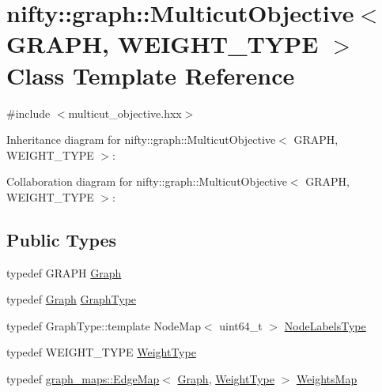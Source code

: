 \hypertarget{classnifty_1_1graph_1_1MulticutObjective}{}\section{nifty\+:\+:graph\+:\+:Multicut\+Objective$<$ G\+R\+A\+P\+H, W\+E\+I\+G\+H\+T\+\_\+\+T\+Y\+P\+E $>$ Class Template Reference}
\label{classnifty_1_1graph_1_1MulticutObjective}


{\ttfamily \#include $<$multicut\+\_\+objective.\+hxx$>$}



Inheritance diagram for nifty\+:\+:graph\+:\+:Multicut\+Objective$<$ G\+R\+A\+P\+H, W\+E\+I\+G\+H\+T\+\_\+\+T\+Y\+P\+E $>$\+:


Collaboration diagram for nifty\+:\+:graph\+:\+:Multicut\+Objective$<$ G\+R\+A\+P\+H, W\+E\+I\+G\+H\+T\+\_\+\+T\+Y\+P\+E $>$\+:
\subsection*{Public Types}
\begin{DoxyCompactItemize}
\item 
typedef G\+R\+A\+P\+H \hyperlink{classnifty_1_1graph_1_1MulticutObjective_a041c561c434976179cbe5a3aebd4dac3}{Graph}
\item 
typedef \hyperlink{classnifty_1_1graph_1_1MulticutObjective_a041c561c434976179cbe5a3aebd4dac3}{Graph} \hyperlink{classnifty_1_1graph_1_1MulticutObjective_a8f0a93eb6756753344c8cce17a7ccafe}{Graph\+Type}
\item 
typedef Graph\+Type\+::template Node\+Map$<$ uint64\+\_\+t $>$ \hyperlink{classnifty_1_1graph_1_1MulticutObjective_ae262294d86c610298954474944613f63}{Node\+Labels\+Type}
\item 
typedef W\+E\+I\+G\+H\+T\+\_\+\+T\+Y\+P\+E \hyperlink{classnifty_1_1graph_1_1MulticutObjective_a38ec1e64c4dcc9e404525e448ced927b}{Weight\+Type}
\item 
typedef \hyperlink{structnifty_1_1graph_1_1graph__maps_1_1EdgeMap}{graph\+\_\+maps\+::\+Edge\+Map}$<$ \hyperlink{classnifty_1_1graph_1_1MulticutObjective_a041c561c434976179cbe5a3aebd4dac3}{Graph}, \hyperlink{classnifty_1_1graph_1_1MulticutObjective_a38ec1e64c4dcc9e404525e448ced927b}{Weight\+Type} $>$ \hyperlink{classnifty_1_1graph_1_1MulticutObjective_a3c05717ad6cce1e8bc07ebbdb99480fe}{Weights\+Map}
\end{DoxyCompactItemize}
